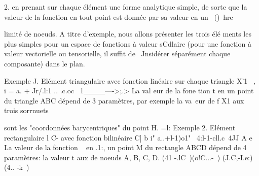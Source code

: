 2. 
en prenant sur chaque élément une forme analytique simple, de sorte que la valeur de la fonction en tout point est donnée par sa valeur en un ~()~hre 


limité de noeuds. A titre d'exemple, nous allons présenter les trois élé
ments  les  plus simples  pour  un  espace  de  fonctions  à  valeur sCdlaire  (pour  
une  fonction  à  valeur vectorielle  ou  tensorielle,  il  suffit de  ~Jnsidérer  
séparément chaque composante)  dans  le plan.  

Exemple J. Elément triangulaire avec fonction linéaire sur chaque triangle 
X'1 ~,
i = a. + Jr/.l:1 .. .c.oc~ 
1____---->;.> 
La val eur de la fone tion t en un point du triangle ABC dépend de 3 paramètres, par exemple la va~eur de f X1 aux trois sorrnuets 


sont les "coordonnées barycentriques" du point H. 
=l: 
Exemple 2. Elément rectangulaire l 
C-
avec fonction bilinéaire 
C] b 
i" a..+l-1)o1" ~4:l-1-cll.c~4JJ 
A e 
La valeur de la fonction ~ en 
.1:, 
un point M du rectangle ABCD dépend de 4 paramètres: la valeur t aux
de 
noeuds A, B, C, D. 
(41 -.lC~)(o!C...-~) (J.C,-I.e:) (4.. -k~)
